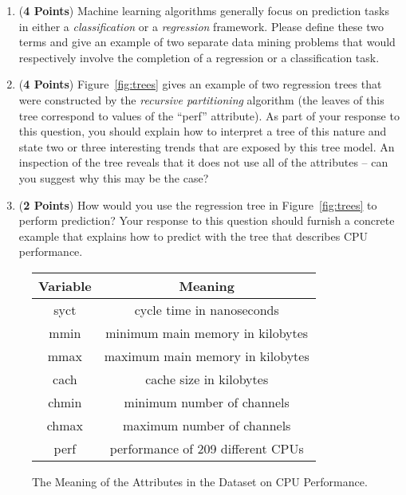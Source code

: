 \documentclass[12pt]{article}
\begin{document}
\begin{enumerate}
  \begin{enumerate}

  \item ({\bf 4 Points}) Machine learning algorithms generally focus on prediction tasks in either a {\em
    classification} or a {\em regression} framework.  Please define these two terms and give an example of two separate
    data mining problems that would respectively involve the completion of a regression or a classification task.

  \item ({\bf 4 Points}) Figure~\ref{fig:trees} gives an example of two regression trees that were constructed by the
    {\em recursive partitioning} algorithm (the leaves of this tree correspond to values of the ``perf'' attribute).  As
    part of your response to this question, you should explain how to interpret a tree of this nature and state two or
    three interesting trends that are exposed by this tree model.  An inspection of the tree reveals that it does not
    use all of the attributes -- can you suggest why this may be the case?

  \item ({\bf 2 Points}) How would you use the regression tree in Figure~\ref{fig:trees} to perform prediction?  Your
    response to this question should furnish a concrete example that explains how to predict with the tree that
    describes CPU performance.

\end{enumerate}

\begin{figure}[h]

  \centering

  \begin{tabular}{c | c}

    {\bf Variable} & {\bf Meaning} \\ \hline

    syct & cycle time in nanoseconds \\ \hline

    mmin & minimum main memory in kilobytes \\ \hline

    mmax & maximum main memory in kilobytes \\ \hline

    cach & cache size in kilobytes \\ \hline

    chmin & minimum number of channels \\ \hline

    chmax & maximum number of channels \\ \hline

    perf & performance of 209 different CPUs

  \end{tabular} 
  \caption{The Meaning of the Attributes in the Dataset on CPU Performance.}
  \label{fig:meaning}

\end{figure}


\end{enumerate}
\end{document}

